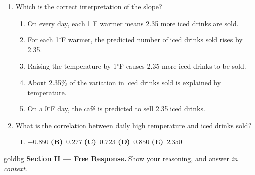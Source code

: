 \documentclass[12pt]{article}
\begin{document}
\begin{enumerate}[leftmargin=1.9em, itemsep=0.08in]

  \item Which is the correct interpretation of the slope?
        \begin{enumerate}[label=\textbf{(\Alph*)}, leftmargin=2.2em, itemsep=0pt]
          \item On every day, each 1$^\circ$F warmer means 2.35 more iced drinks are sold.
          \item For each 1$^\circ$F warmer, the predicted number of iced drinks sold rises by 2.35.
          \item Raising the temperature by 1$^\circ$F causes 2.35 more iced drinks to be sold.
          \item About 2.35\% of the variation in iced drinks sold is explained by temperature.
          \item On a 0$^\circ$F day, the caf\'e is predicted to sell 2.35 iced drinks.
                \hfill{}\rule[-0.2in]{0pt}{0.48in}
        \end{enumerate}

  \item What is the correlation between daily high temperature and iced drinks sold?
        \hfill{}\rule[-0.2in]{0pt}{0.48in}
        \begin{enumerate}[label=\textbf{(\Alph*)}, leftmargin=2.2em, itemsep=0pt]
          \item $-0.850$ \hfill \textbf{(B)}\ $0.277$ \hfill \textbf{(C)}\ $0.723$ \hfill
                \textbf{(D)}\ $0.850$ \hfill \textbf{(E)}\ $2.350$ \hspace*{2em}
        \end{enumerate}

\end{enumerate}

\boxguard[22]
\begin{headlinebox}{goldbg}
\small
\textbf{Section II --- Free Response.} Show your reasoning, and answer \emph{in context}.
\end{headlinebox}
\end{document}
